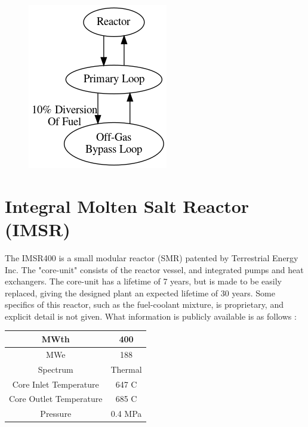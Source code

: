 \documentclass[letterpaper]{article}
\begin{document}
\begin{figure}[H]
  \centering
  \includegraphics[height=.5\textheight]{figures/dmsr-proc.png}
  \label{fig:figG}
\end{figure}

\section{Integral Molten Salt Reactor (IMSR)}

The IMSR400 is a small modular reactor (SMR) patented by Terrestrial Energy Inc.  The "core-unit" consists of the reactor vessel, and integrated pumps and heat exchangers.  The core-unit has a lifetime of 7 years, but is made to be easily replaced, giving the designed plant an expected lifetime of 30 years.  Some specifics of this reactor, such as the fuel-coolant mixture, is proprietary, and explicit detail is not given.  What information is publicly available is as follows \cite{leblanc_18_2017}:

\begin{center}
\begin{tabular}{|c|c|}
\hline
MWth & 400 \\
\hline
MWe & 188 \\
\hline
Spectrum & Thermal \\
\hline
Core Inlet Temperature & 647 C \\
\hline
Core Outlet Temperature & 685 C\\
\hline
Pressure & 0.4 MPa \\
\hline
\end{tabular}
\end{center}
\end{document}
